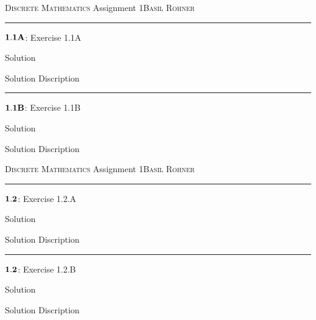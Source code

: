 \documentclass[12pt]{amsart}
\newcommand{\heading}{ {\scshape Discrete Mathematics} \hfill Assignment 1\hfill {\scshape Basil Rohner} }
\newcommand{\newexer}{ \bigskip \bigskip \hrule \bigskip \bigskip }
\newcommand{\newpageexcer}{ \newpage \heading \smallskip \hrule \bigskip \bigskip }
\newcommand{\bigbigskip}{ \bigskip \bigskip }
\begin{document}
\newpageexcer

$\bold{1.1A}$: Exercise 1.1A

\bigbigskip

Solution

\bigbigskip

Solution Discription

\newexer

$\bold{1.1B}$: Exercise 1.1B

\bigbigskip

Solution

\bigbigskip

Solution Discription

\newpageexcer

$\bold{1.2}$: Exercise 1.2.A

\bigbigskip

Solution

\bigbigskip

Solution Discription

\newexer

$\bold{1.2}$: Exercise 1.2.B

\bigbigskip

Solution

\bigbigskip

Solution Discription
\end{document}
